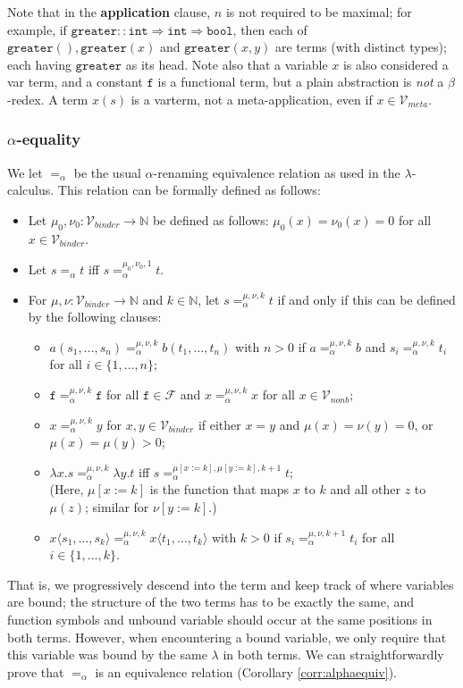 \documentclass{lmcs}
\theoremstyle{theorem}\newtheorem{theorem}{Theorem}
\theoremstyle{theorem}\newtheorem{lemma}[theorem]{Lemma}
\theoremstyle{theorem}\newtheorem{corollary}[theorem]{Corollary}
\theoremstyle{definition}\newtheorem{definition}[theorem]{Definition}
\theoremstyle{definition}\newtheorem{example}[theorem]{Example}
\newcommand{\N}{\mathbb{N}}
\newcommand{\F}{\mathcal{F}}
\newcommand{\Vmeta}{\mathcal{V}_{\mathit{meta}}}
\newcommand{\Vfree}{\mathcal{V}_{\mathit{nonb}}}
\newcommand{\Vbound}{\mathcal{V}_{\mathit{binder}}}
\newcommand{\identifier}[1]{\mathtt{#1}}
\newcommand{\afun}{\identifier{f}}
\newcommand{\avar}{x}
\newcommand{\bvar}{y}
\newcommand{\cvar}{z}
\newcommand{\clause}[1]{\textbf{#1}}
\newcommand{\abs}[2]{\lambda #1.#2}
\newcommand{\meta}[2]{#1\langle#2\rangle}
\newcommand{\arrtype}{\Rightarrow}
\newcommand{\symb}[1]{\mathtt{#1}}
\newcommand{\mysubsection}[1]{\vspace{-12pt}\subsubsection{#1}}
\begin{document}
Note that in the \clause{application} clause, $n$ is not required to be maximal; for example, if
$\symb{greater} :: \mathtt{int} \arrtype \mathtt{int} \arrtype \mathtt{bool}$, then each of
$\symb{greater}(),\symb{greater}(\avar)$ and $\symb{greater}(\avar,\bvar)$ are terms (with distinct
types); each having $\symb{greater}$ as its head.
Note also that a variable $\avar$ is also considered a var term, and a constant $\afun$ is a
functional term, but a plain abstraction is \emph{not} a $\beta$-redex.
A term $\avar(s)$ is a varterm, not a meta-application, even if $\avar \in \Vmeta$.

\mysubsection{$\alpha$-equality}
We let $=_\alpha$ be the usual $\alpha$-renaming equivalence relation as used in the
$\lambda$-calculus. This relation can be formally defined as follows:
\begin{itemize}
\item Let $\mu_0,\nu_0 : \Vbound \rightarrow \N$ be defined as follows:
  $\mu_0(\avar) = \nu_0(\avar) = 0$ for all $\avar \in \Vbound$.
\item Let $s =_\alpha t$ iff $s =_\alpha^{\mu_0,\nu_0,1} t$.
\item For $\mu,\nu : \Vbound \rightarrow \N$ and $k \in \N$, let
  $s =_\alpha^{\mu,\nu,k} t$ if and only if this can be defined by the following clauses:
  \begin{itemize}
  \item $a(s_1,\dots,s_n) =_\alpha^{\mu,\nu,k} b(t_1,\dots,t_n)$ with $n > 0$ if
    $a =_\alpha^{\mu,\nu,k} b$ and $s_i =_\alpha^{\mu,\nu,k} t_i$ for all $i \in \{1,\dots,n\}$;
  \item $\afun =_\alpha^{\mu,\nu,k} \afun$ for all $\afun \in \F$ and
        $\avar =_\alpha^{\mu,\nu,k} \avar$ for all $\avar \in \Vfree$;
  \item $\avar =_\alpha^{\mu,\nu,k} \bvar$ for $\avar,\bvar \in \Vbound$ if either
    $\avar = \bvar$ and $\mu(\avar) = \nu(\bvar) = 0$, or $\mu(\avar) = \mu(\bvar) > 0$;
  \item $\abs{\avar}{s} =_\alpha^{\mu,\nu,k} \abs{\bvar}{t}$ iff $s =_\alpha^{\mu[\avar:=k],
    \mu[\bvar:=k],k+1} t$; \\
    (Here, $\mu[\avar:=k]$ is the function that maps $\avar$ to $k$ and all other $\cvar$ to
    $\mu(\cvar)$; similar for $\nu[\bvar:=k]$.)
  \item $\meta{\avar}{s_1,\dots,s_k} =_\alpha^{\mu,\nu,k} \meta{\avar}{t_1,\dots,t_k}$ with $k
    > 0$ if $s_i =_\alpha^{\mu,\nu,k+1} t_i$ for all $i \in \{1,\dots,k\}$.
  \end{itemize}
\end{itemize}
That is, we progressively descend into the term and keep track of where variables are bound; the
structure of the two terms has to be exactly the same, and function symbols and unbound variable
should occur at the same positions in both terms. However, when encountering a bound variable, we
only require that this variable was bound by the same $\lambda$ in both terms.
We can straightforwardly prove that $=_\alpha$ is an equivalence relation (Corollary
\ref{corr:alphaequiv}).
\end{document}
